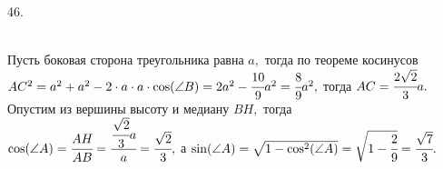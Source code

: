 46. \begin{figure}[ht!]
\end{figure}\\
Пусть боковая сторона треугольника равна $a,$ тогда по теореме косинусов $AC^2=a^2+a^2-2\cdot a\cdot a\cdot \cos(\angle B)=2a^2-\cfrac{10}{9}a^2=\cfrac{8}{9}a^2,$
тогда $AC=\cfrac{2\sqrt{2}}{3}a.$ Опустим из вершины высоту и медиану $BH,$ тогда $\cos(\angle A)=\cfrac{AH}{AB}=\cfrac{\cfrac{\sqrt{2}}{3}a}{a}=\cfrac{\sqrt{2}}{3},$
а $\sin(\angle A)=\sqrt{1-\cos^2(\angle A)}=\sqrt{1-\cfrac{2}{9}}=\cfrac{\sqrt{7}}{3}.$\\
